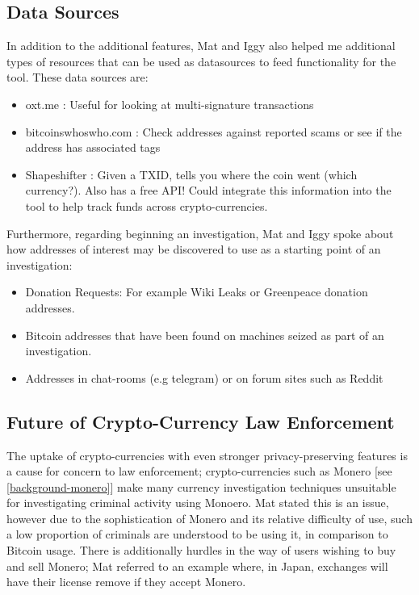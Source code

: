\subsection{Data Sources}
In addition to the additional features, Mat and Iggy also helped me additional types of resources that can be used as datasources to feed functionality for the tool. These data sources are:
\begin{itemize}
    \item oxt.me : Useful for looking at multi-signature transactions
    \item bitcoinswhoswho.com : Check addresses against reported scams or see if the address has associated tags
    \item Shapeshifter : Given a TXID, tells you where the coin went (which currency?). Also has a free API! Could integrate this information into the tool to help track funds across crypto-currencies. 
\end{itemize}

Furthermore, regarding beginning an investigation, Mat and Iggy spoke about how addresses of interest may be discovered to use as a starting point of an investigation:
\begin{itemize}
    \item Donation Requests: For example Wiki Leaks or Greenpeace donation addresses. 
    \item Bitcoin addresses that have been found on machines seized as part of an investigation. 
    \item Addresses in chat-rooms (e.g telegram) or on forum sites such as Reddit
\end{itemize}

\subsection{Future of Crypto-Currency Law Enforcement}
The uptake of crypto-currencies with even stronger privacy-preserving features is a cause for concern to law enforcement; crypto-currencies such as Monero [see \ref{background-monero}] make many currency investigation techniques unsuitable for investigating criminal activity using Monoero. Mat stated this is an issue, however due to the sophistication of Monero and its relative difficulty of use, such a low proportion of criminals are understood to be using it, in comparison to Bitcoin usage. There is additionally hurdles in the way of users wishing to buy and sell Monero; Mat referred to an example where, in Japan, exchanges will have their license remove if they accept Monero.

